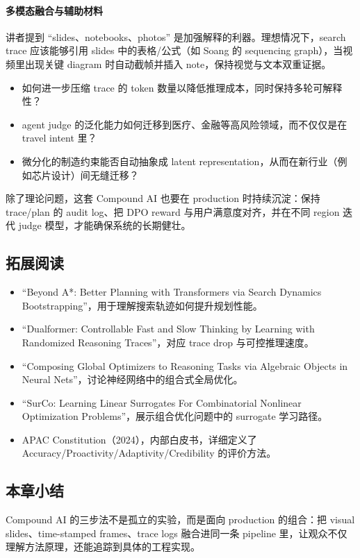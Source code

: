 \paragraph{多模态融合与辅助材料}
讲者提到 ``slides、notebooks、photos'' 是加强解释的利器。理想情况下，search trace 应该能够引用 slides 中的表格/公式（如 Soang 的 sequencing graph），当视频里出现关键 diagram 时自动截帧并插入 note，保持视觉与文本双重证据。

\begin{itemize}
    \item 如何进一步压缩 trace 的 token 数量以降低推理成本，同时保持多轮可解释性？
    \item agent judge 的泛化能力如何迁移到医疗、金融等高风险领域，而不仅仅是在 travel intent 里？
    \item 微分化的制造约束能否自动抽象成 latent representation，从而在新行业（例如芯片设计）间无缝迁移？
\end{itemize}

除了理论问题，这套 Compound AI 也要在 production 时持续沉淀：保持 trace/plan 的 audit log、把 DPO reward 与用户满意度对齐，并在不同 region 迭代 judge 模型，才能确保系统的长期健壮。

\subsection{拓展阅读}
\begin{itemize}
    \item ``Beyond A*: Better Planning with Transformers via Search Dynamics Bootstrapping''，用于理解搜索轨迹如何提升规划性能。
    \item ``Dualformer: Controllable Fast and Slow Thinking by Learning with Randomized Reasoning Traces''，对应 trace drop 与可控推理速度。
    \item ``Composing Global Optimizers to Reasoning Tasks via Algebraic Objects in Neural Nets''，讨论神经网络中的组合式全局优化。
    \item ``SurCo: Learning Linear Surrogates For Combinatorial Nonlinear Optimization Problems''，展示组合优化问题中的 surrogate 学习路径。
    \item APAC Constitution（2024），内部白皮书，详细定义了 Accuracy/Proactivity/Adaptivity/Credibility 的评价方法。
\end{itemize}

\subsection{本章小结}
Compound AI 的三步法不是孤立的实验，而是面向 production 的组合：把 visual slides、time-stamped frames、trace logs 融合进同一条 pipeline 里，让观众不仅理解方法原理，还能追踪到具体的工程实现。


